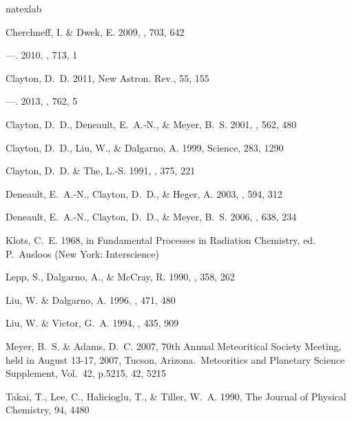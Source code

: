 \documentclass[manuscript]{aastex}
\newcommand{\nar}{New Astron. Rev.}
\begin{document}
\begin{thebibliography}{14}
\expandafter\ifx\csname natexlab\endcsname\relax\def\natexlab#1{#1}\fi

{Cherchneff}, I. \& {Dwek}, E. 2009, \apjl, 703, 642

---. 2010, \apj, 713, 1

{Clayton}, D.~D. 2011, \nar, 55, 155

---. 2013, \apj, 762, 5

{Clayton}, D.~D., {Deneault}, E.~A.-N., \& {Meyer}, B.~S. 2001, \apj, 562, 480

{Clayton}, D.~D., {Liu}, W., \& {Dalgarno}, A. 1999, Science, 283, 1290

{Clayton}, D.~D. \& {The}, L.-S. 1991, \apj, 375, 221

{Deneault}, E.~A.-N., {Clayton}, D.~D., \& {Heger}, A. 2003, \apj, 594, 312

{Deneault}, E.~A.-N., {Clayton}, D.~D., \& {Meyer}, B.~S. 2006, \apj, 638, 234

{Klots}, C.~E. 1968, in Fundamental Processes in Radiation Chemistry, ed.
  P.~{Ausloos} (New York: Interscience)

{Lepp}, S., {Dalgarno}, A., \& {McCray}, R. 1990, \apj, 358, 262

{Liu}, W. \& {Dalgarno}, A. 1996, \apj, 471, 480

{Liu}, W. \& {Victor}, G.~A. 1994, \apj, 435, 909

{Meyer}, B.~S. \& {Adams}, D.~C. 2007, 70th Annual Meteoritical Society
  Meeting, held in August 13-17, 2007, Tucson, Arizona.~Meteoritics and
  Planetary Science Supplement, Vol.~42, p.5215, 42, 5215

Takai, T., Lee, C., Halicioglu, T., \& Tiller, W.~A. 1990, The Journal of
  Physical Chemistry, 94, 4480

\end{thebibliography}
\end{document}
